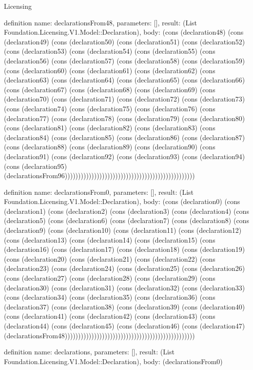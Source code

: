 \begin{lexlean}{Licensing}
\begin{semanticmodule}
definition{
  name: declarationsFrom48,
  parameters: [],
  result: (List Foundation.Licensing.V1.Model::Declaration),
  body: (cons (declaration48) (cons (declaration49) (cons (declaration50) (cons (declaration51) (cons (declaration52) (cons (declaration53) (cons (declaration54) (cons (declaration55) (cons (declaration56) (cons (declaration57) (cons (declaration58) (cons (declaration59) (cons (declaration60) (cons (declaration61) (cons (declaration62) (cons (declaration63) (cons (declaration64) (cons (declaration65) (cons (declaration66) (cons (declaration67) (cons (declaration68) (cons (declaration69) (cons (declaration70) (cons (declaration71) (cons (declaration72) (cons (declaration73) (cons (declaration74) (cons (declaration75) (cons (declaration76) (cons (declaration77) (cons (declaration78) (cons (declaration79) (cons (declaration80) (cons (declaration81) (cons (declaration82) (cons (declaration83) (cons (declaration84) (cons (declaration85) (cons (declaration86) (cons (declaration87) (cons (declaration88) (cons (declaration89) (cons (declaration90) (cons (declaration91) (cons (declaration92) (cons (declaration93) (cons (declaration94) (cons (declaration95) (declarationsFrom96)))))))))))))))))))))))))))))))))))))))))))))))))
}

definition{
  name: declarationsFrom0,
  parameters: [],
  result: (List Foundation.Licensing.V1.Model::Declaration),
  body: (cons (declaration0) (cons (declaration1) (cons (declaration2) (cons (declaration3) (cons (declaration4) (cons (declaration5) (cons (declaration6) (cons (declaration7) (cons (declaration8) (cons (declaration9) (cons (declaration10) (cons (declaration11) (cons (declaration12) (cons (declaration13) (cons (declaration14) (cons (declaration15) (cons (declaration16) (cons (declaration17) (cons (declaration18) (cons (declaration19) (cons (declaration20) (cons (declaration21) (cons (declaration22) (cons (declaration23) (cons (declaration24) (cons (declaration25) (cons (declaration26) (cons (declaration27) (cons (declaration28) (cons (declaration29) (cons (declaration30) (cons (declaration31) (cons (declaration32) (cons (declaration33) (cons (declaration34) (cons (declaration35) (cons (declaration36) (cons (declaration37) (cons (declaration38) (cons (declaration39) (cons (declaration40) (cons (declaration41) (cons (declaration42) (cons (declaration43) (cons (declaration44) (cons (declaration45) (cons (declaration46) (cons (declaration47) (declarationsFrom48)))))))))))))))))))))))))))))))))))))))))))))))))
}

definition{
  name: declarations,
  parameters: [],
  result: (List Foundation.Licensing.V1.Model::Declaration),
  body: (declarationsFrom0)
}


\end{semanticmodule}
\end{lexlean}
